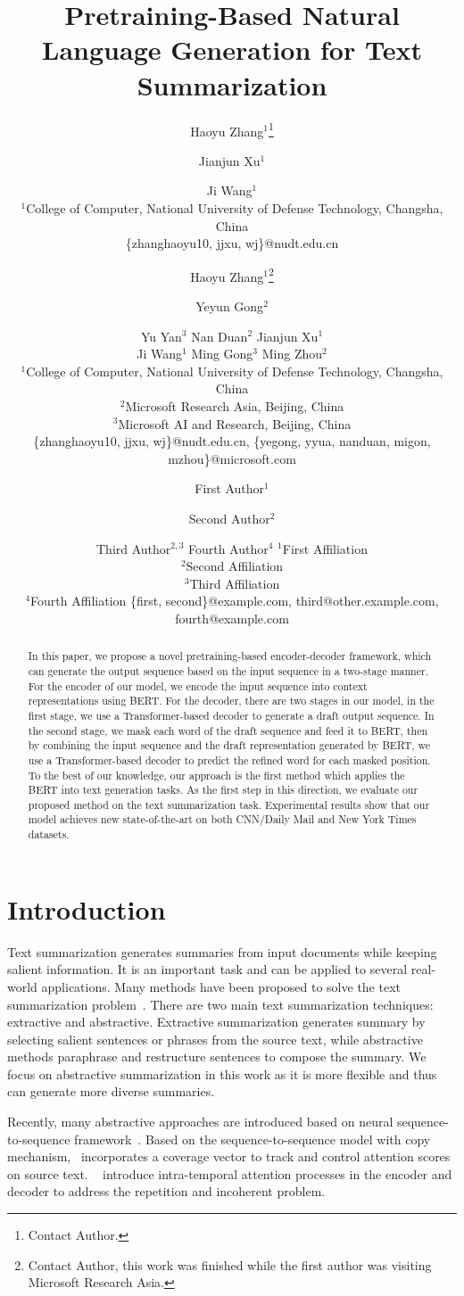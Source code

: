 \documentclass{article}
\title{Pretraining-Based Natural Language Generation for Text Summarization}
\author{
Haoyu Zhang$^1$\footnote{Contact Author.}\and Jianjun Xu$^{1}$\and Ji Wang$^{1}$\\
\affiliations
$^1$College of Computer, National University of Defense Technology, Changsha, China\\
\emails
\{zhanghaoyu10, jjxu, wj\}@nudt.edu.cn
}
\author{
Haoyu Zhang$^1$\footnote{Contact Author, this work was finished while the first author was visiting Microsoft Research Asia.}\and
Yeyun Gong$^2$\and
Yu Yan$^3$\And
Nan Duan$^2$\And
Jianjun Xu$^{1}$\And \\
Ji Wang$^{1}$\And
Ming Gong$^{3}$\And
Ming Zhou$^{2}$\\
\affiliations
$^1$College of Computer, National University of Defense Technology, Changsha, China\\
$^2$Microsoft Research Asia, Beijing, China\\
$^3$Microsoft AI and Research, Beijing, China\\
\emails
\{zhanghaoyu10, jjxu, wj\}@nudt.edu.cn,
\{yegong, yyua, nanduan, migon, mzhou\}@microsoft.com
}
\author{
First Author$^1$
\and
Second Author$^2$\and
Third Author$^{2,3}$\And
Fourth Author$^4$
\affiliations
$^1$First Affiliation\\
$^2$Second Affiliation\\
$^3$Third Affiliation\\
$^4$Fourth Affiliation
\emails
\{first, second\}@example.com,
third@other.example.com,
fourth@example.com
}
\begin{document}
\maketitle

\begin{abstract}

In this paper, we propose a novel pretraining-based encoder-decoder framework, which can generate the output sequence based on the input sequence in a two-stage manner. For the encoder of our model, we encode the input sequence into context representations using BERT.
For the decoder, there are two stages in our model, in the first stage, we use a Transformer-based decoder to generate a draft output sequence.
In the second stage, we mask each word of the draft sequence and feed it to BERT, then by combining the input sequence and the draft representation generated by BERT, we use a Transformer-based decoder to predict the refined word for each masked position.
To the best of our knowledge, our approach is the first method which applies the BERT into text generation tasks.
As the first step in this direction, we evaluate our proposed method on the text summarization task. 
Experimental results show that our model achieves new state-of-the-art on both CNN/Daily Mail and New York Times datasets.

\end{abstract}

\section{Introduction} 
Text summarization generates summaries from input documents while keeping salient information. It is an important task and can be applied to several real-world applications. Many methods have been proposed to solve the text summarization problem~\cite{See2017,NallapatiZZ17,DBLP:conf/acl/ZhaoZWYHZ18,gehrmann2018bottom}. There are two main text summarization techniques: extractive and abstractive. 
Extractive summarization generates summary by selecting salient sentences or phrases from the source text, while abstractive methods paraphrase and restructure sentences to compose the summary. We focus on abstractive summarization in this work as it is more flexible and thus can generate more diverse summaries.

Recently, many abstractive approaches are introduced based on neural sequence-to-sequence framework~\cite{Paulus2018,See2017,gehrmann2018bottom,Li2018}. 
Based on the sequence-to-sequence model with copy mechanism,~\cite{See2017} incorporates a coverage vector to track and control attention scores on source text.
~\cite{Paulus2018} introduce intra-temporal attention processes in the encoder and decoder to address the repetition and incoherent problem.
\end{document}
